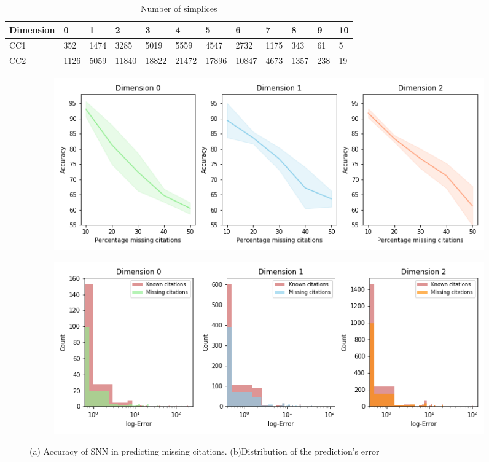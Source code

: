 \begin{table}[htbp]
  \caption{%
  Number of simplices
  }
  \label{table:Simplices-coauthor}
  \centering
  \scriptsize{
  \begin{tabular}{llllllllllll}
    \cmidrule(r){1-12}
    Dimension   & 0     & 1  & 2     & 3 & 4     & 5 & 6    & 7 & 8   & 9 & 10\\
    \midrule
    CC1 & 352  & 1474  & 3285  & 5019  & 5559  & 4547  & 2732  & 1175  & 343 & 61 & 5\\
    CC2 & 1126 & 5059 & 11840 & 18822 & 21472 & 17896  & 10847 & 4673 & 1357 & 238 & 19\\ 
    \bottomrule
  \end{tabular}}
\end{table}
\begin{figure}[tb]
\centering
 \begin{subfigure}[t]{-0.8\textwidth}
 \vspace{-4cm}
  \end{subfigure}
\begin{subfigure}[t]{0.8\textwidth}
\centering
   \includegraphics[scale=0.35]{./figures/accuracy_network1.png}
\end{subfigure}
 \begin{subfigure}[t]{0.8\textwidth}
  \end{subfigure}
\begin{subfigure}[t]{0.8\textwidth}
\centering
\vspace{-0.5cm}
   \includegraphics[scale=0.36]{./figures/Error_dist_start150250_seed6666_notsee40.png}
\end{subfigure}
\caption{(a) Accuracy of SNN in predicting missing citations. (b)Distribution of the prediction's error}
\label{fig:accuracy-error}
\end{figure}
